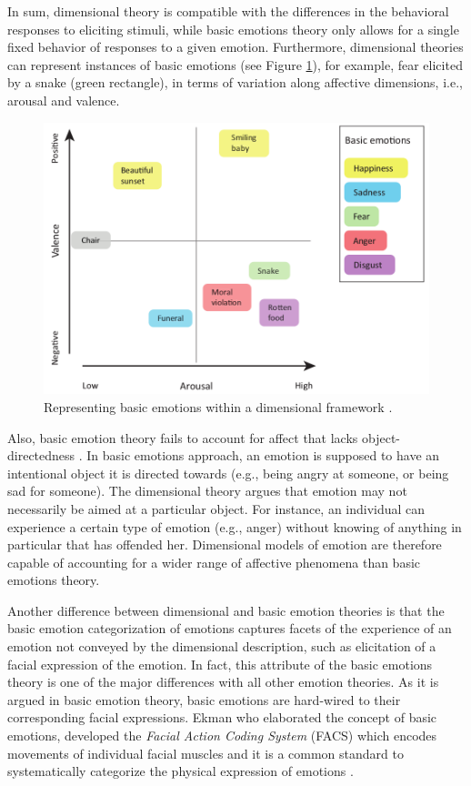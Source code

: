 \documentclass[11pt]{article}
\begin{document}
In sum, dimensional theory is compatible with the differences in the behavioral
responses to eliciting stimuli, while basic emotions theory only allows for a
single fixed behavior of responses to a given emotion. Furthermore, dimensional
theories can represent instances of basic emotions (see Figure
\ref{fig:dimensional-discrete}), for example, fear elicited by a snake (green
rectangle), in terms of variation along affective dimensions, i.e., arousal and
valence.

\begin{figure}[tbh]
  \center
  \includegraphics[width=.9\textwidth]{figure/dimensional-discrete.png}
  \caption{Representing basic emotions within a dimensional framework
  \cite{hamann:mapping-discrete-dimensional}.}
  \label{fig:dimensional-discrete}
\end{figure}

Also, basic emotion theory fails to account for affect that lacks
object-directedness \cite{russell:core-affect}. In basic emotions approach, an
emotion is supposed to have an intentional object it is directed towards (e.g.,
being angry at someone, or being sad for someone). The dimensional theory argues
that emotion may not necessarily be aimed at a particular object. For instance,
an individual can experience a certain type of emotion (e.g., anger) without
knowing of anything in particular that has offended her. Dimensional models of
emotion are therefore capable of accounting for a wider range of affective
phenomena than basic emotions theory.

Another difference between dimensional and basic emotion theories is that the
basic emotion categorization of emotions captures facets of the experience of
an emotion not conveyed by the dimensional description, such as elicitation of a
facial expression of the emotion. In fact, this attribute of the basic
emotions theory is one of the major differences with all other emotion theories.
As it is argued in basic emotion theory, basic emotions are hard-wired to their
corresponding facial expressions. Ekman who elaborated the concept of basic
emotions, developed the \textit{Facial Action Coding System} (FACS) which
encodes movements of individual facial muscles and it is a common standard to
systematically categorize the physical expression of emotions
\cite{ekman:facial-movement}.
\end{document}
